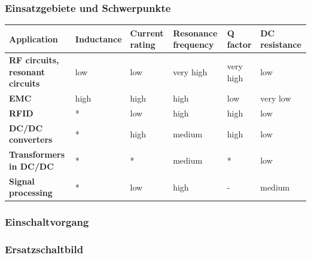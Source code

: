\subsubsection{Einsatzgebiete und Schwerpunkte}
\begin{longtable}{|p{3.5cm}|l|l|l|l|l|}
\hline
\textbf{Application}&Inductance&Current rating&Resonance frequency&Q factor&DC
resistance\\
\hline
\textbf{RF circuits, resonant circuits}&low&low&very high&very high&low\\
\hline
\textbf{EMC}&high&high&high&low&very low\\
\hline
\textbf{RFID}&*&low&high&high&low\\
\hline
\textbf{DC/DC converters}&*&high&medium&high&low\\
\hline
\textbf{Transformers in DC/DC}&*&*&medium&*&low\\
\hline
\textbf{Signal processing}&*&low&high&-&medium\\
\hline
\end{longtable}

\subsubsection{Einschaltvorgang}


\subsubsection{Ersatzschaltbild}


